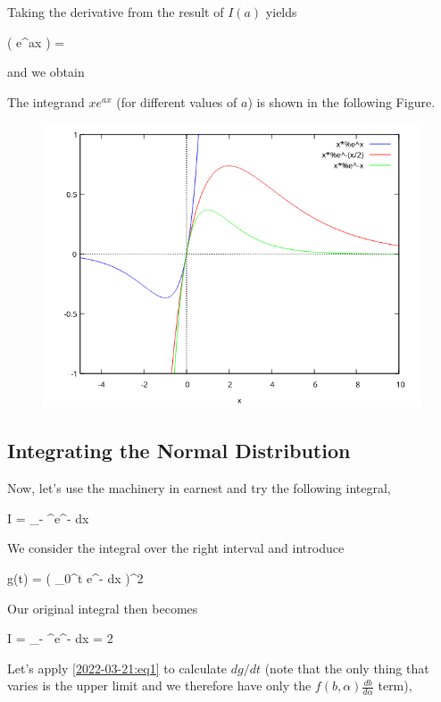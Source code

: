 Taking the derivative from the result of $I(a)$ yields

\bee
{} \left(  e^{ax} \right) = 
\eee

and we obtain

\bee
{}
\eee

The integrand $x e^{ax}$ (for different values of $a$) is shown in the following Figure.

\begin{figure}[H]
    \includegraphics[scale=0.7]{images/2022-03-21_plot_2.png}
\end{figure}
    

\subsection{Integrating the Normal Distribution}

Now, let's use the machinery in earnest and try the following integral,

\bee
I = \int_{- \infty}^\infty e^{-} dx
\eee

We consider the integral over the right interval and introduce

\bee
g(t) = \left( \int_{0}^t e^{-} dx \right)^2
\eee

Our original integral then becomes

\bee
I = \int_{- \infty}^\infty e^{-} dx = 2 
\eee

Let's apply \eqref{2022-03-21:eq1} to calculate $dg/dt$ (note that the only thing that varies is the upper limit and we therefore have only the $f(b, \alpha) \frac{db}{d \alpha}$ term),

